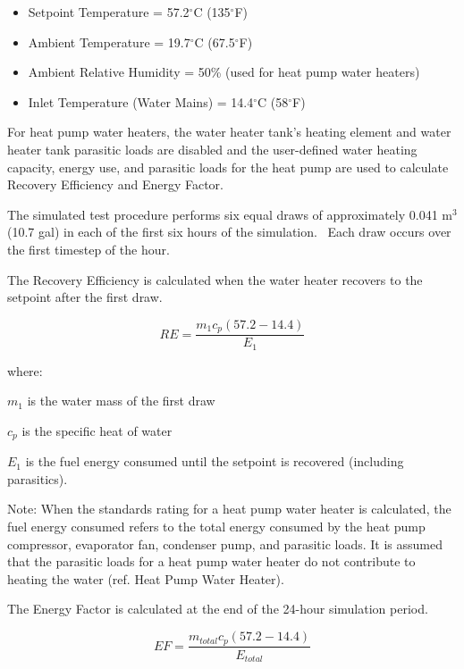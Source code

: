\begin{itemize}
\item Setpoint Temperature = 57.2\(^{\circ}\)C (135\(^{\circ}\)F)
\item Ambient Temperature = 19.7\(^{\circ}\)C (67.5\(^{\circ}\)F)
\item Ambient Relative Humidity = 50\% (used for heat pump water heaters)
\item Inlet Temperature (Water Mains) = 14.4\(^{\circ}\)C (58\(^{\circ}\)F)
\end{itemize}

For heat pump water heaters, the water heater tank's heating element and water heater tank parasitic loads are disabled and the user-defined water heating capacity, energy use, and parasitic loads for the heat pump are used to calculate Recovery Efficiency and Energy Factor.

The simulated test procedure performs six equal draws of approximately 0.041 m\(^{3}\) (10.7 gal) in each of the first six hours of the simulation.~ Each draw occurs over the first timestep of the hour.

The Recovery Efficiency is calculated when the water heater recovers to the setpoint after the first draw.

\begin{equation}
RE = \frac{{{m_1}{c_p}\left( {57.2 - 14.4} \right)}}{{{E_1}}}
\end{equation}

where:

\(m_{1}\) is the water mass of the first draw

\(c_{p}\) is the specific heat of water

\(E_{1}\) is the fuel energy consumed until the setpoint is recovered (including parasitics).

Note: When the standards rating for a heat pump water heater is calculated, the fuel energy consumed refers to the total energy consumed by the heat pump compressor, evaporator fan, condenser pump, and parasitic loads. It is assumed that the parasitic loads for a heat pump water heater do not contribute to heating the water (ref. Heat Pump Water Heater).

The Energy Factor is calculated at the end of the 24-hour simulation period.

\begin{equation}
EF = \frac{{{m_{total}}{c_p}\left( {57.2 - 14.4} \right)}}{{{E_{total}}}}
\end{equation}

